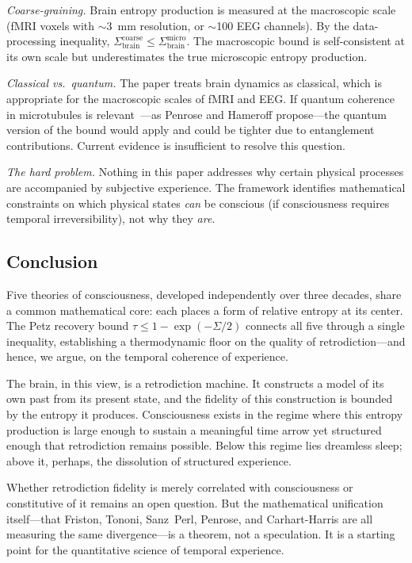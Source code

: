 \documentclass[prl,twocolumn,superscriptaddress,longbibliography,floatfix]{revtex4-2}
\newcommand{\tauasym}{\tau}
\newcommand{\Sbrain}{\Sigma_{\mathrm{brain}}}
\begin{document}
\emph{Coarse-graining.}  Brain entropy production is measured at the
macroscopic scale (fMRI voxels with $\sim$3~mm resolution, or
$\sim$100 EEG channels).  By the data-processing inequality,
$\Sbrain^{\mathrm{coarse}} \leq \Sbrain^{\mathrm{micro}}$.  The
macroscopic bound is self-consistent at its own scale but
underestimates the true microscopic entropy production.

\emph{Classical vs.\ quantum.}  The paper treats brain dynamics as
classical, which is appropriate for the macroscopic scales of fMRI
and EEG.  If quantum coherence in microtubules is
relevant~\cite{Barbatti2024}---as Penrose and Hameroff
propose---the quantum version of the bound would apply and could be
tighter due to entanglement contributions.  Current evidence is
insufficient to resolve this question.

\emph{The hard problem.}  Nothing in this paper addresses why
certain physical processes are accompanied by subjective experience.
The framework identifies mathematical constraints on which physical
states \emph{can} be conscious (if consciousness requires temporal
irreversibility), not why they \emph{are}.

\subsection{Conclusion}
\label{subsec:conclusion}

Five theories of consciousness, developed independently over three
decades, share a common mathematical core: each places a
form of relative entropy at its center.  The Petz recovery bound
$\tauasym \leq 1 - \exp(-\Sigma/2)$ connects all five through a
single inequality, establishing a thermodynamic floor on the
quality of retrodiction---and hence, we argue, on the temporal
coherence of experience.

The brain, in this view, is a retrodiction machine.  It constructs
a model of its own past from its present state, and the fidelity of
this construction is bounded by the entropy it produces.
Consciousness exists in the regime where this entropy production
is large enough to sustain a meaningful time arrow yet structured
enough that retrodiction remains possible.  Below this regime lies
dreamless sleep; above it, perhaps, the dissolution of structured
experience.

Whether retrodiction fidelity is merely correlated with
consciousness or constitutive of it remains an open question.  But
the mathematical unification itself---that Friston, Tononi,
Sanz~Perl, Penrose, and Carhart-Harris are all measuring the same
divergence---is a theorem, not a speculation.  It is a starting
point for the quantitative science of temporal experience.
\end{document}
